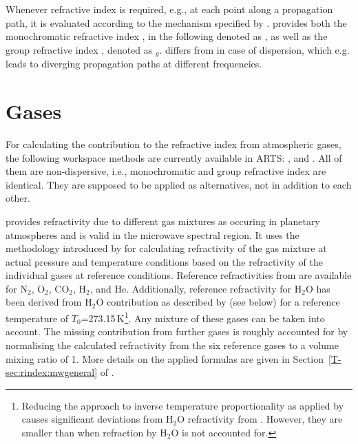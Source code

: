 Whenever refractive index is required, e.g., at each point along a propagation
path, it is evaluated according to the mechanism specified by
. 
provides both the monochromatic refractive index ,
in the following denoted as \Rfr, as well as the group refractive index
, denoted as \Rfr$_{g}$.
 differs from 
in case of dispersion, which e.g. leads to diverging
propagation paths at different frequencies.


\section{Gases}
%
For calculating the contribution to the refractive index from atmospheric
gases, the following workspace methods are currently available in ARTS:
,  and
. All of them are non-dispersive, i.e.,
monochromatic and group refractive index are identical. They are supposed to be
applied as alternatives, not in addition to each other.

 provides refractivity due to different gas
mixtures as occuring in planetary atmospheres and is valid in the microwave
spectral region. It uses the methodology introduced by
\citet{newell65:_absolute_jap} for calculating refractivity of the gas mixture
at actual pressure and temperature conditions based on the refractivity of the
individual gases at reference conditions. Reference refractivities from
\citet{newell65:_absolute_jap} are available for N$_2$, O$_2$, CO$_2$, H$_2$,
and He.  Additionally, reference refractivity for H$_2$O has been derived from
H$_2$O contribution as described by  (see
below) for a reference temperature of $T_0$=273.15\,K\footnote{Reducing the
 approach to inverse temperature
proportionality as applied by  causes
significant deviations from H$_2$O refractivity from
. However, they are smaller than when
refraction by H$_2$O is not accounted for.}.
Any mixture of these gases can be taken into account. The missing
contribution from further gases is roughly accounted for by
normalising the calculated refractivity from the six reference gases to a
volume mixing ratio of 1. More details on the applied formulas are given in
Section~\ref{T-sec:rindex:mwgeneral} of \theory.

